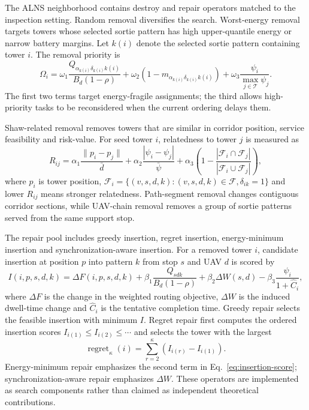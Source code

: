The ALNS neighborhood contains destroy and repair operators matched to the inspection setting. Random removal diversifies the search. Worst-energy removal targets towers whose selected sortie pattern has high upper-quantile energy or narrow battery margins. Let $k(i)$ denote the selected sortie pattern containing tower $i$. The removal priority is
\begin{equation}
\Omega_i=\omega_1\frac{Q_{\alpha_{k(i)}\delta_{k(i)}k(i)}}{B_d(1-\rho)}
+\omega_2\left(1-m_{\alpha_{k(i)}\delta_{k(i)}k(i)}\right)
+\omega_3\frac{\psi_i}{\max_{j\in\mathcal{T}}\psi_j}.
\label{eq:removal-score}
\end{equation}
The first two terms target energy-fragile assignments; the third allows high-priority tasks to be reconsidered when the current ordering delays them.

Shaw-related removal removes towers that are similar in corridor position, service feasibility and risk-value. For seed tower $i$, relatedness to tower $j$ is measured as
\begin{equation}
R_{ij}=\alpha_1\frac{\|p_i-p_j\|}{\bar d}
+\alpha_2\frac{|\psi_i-\psi_j|}{\bar\psi}
+\alpha_3\left(1-\frac{|\mathcal{F}_i\cap\mathcal{F}_j|}{|\mathcal{F}_i\cup\mathcal{F}_j|}\right),
\label{eq:shaw-relatedness}
\end{equation}
where $p_i$ is tower position, $\mathcal{F}_i=\{(v,s,d,k):(v,s,d,k)\in\mathcal{F},\delta_{ik}=1\}$ and lower $R_{ij}$ means stronger relatedness. Path-segment removal changes contiguous corridor sections, while UAV-chain removal removes a group of sortie patterns served from the same support stop.

The repair pool includes greedy insertion, regret insertion, energy-minimum insertion and synchronization-aware insertion. For a removed tower $i$, candidate insertion at position $p$ into pattern $k$ from stop $s$ and UAV $d$ is scored by
\begin{equation}
I(i,p,s,d,k)=\Delta F(i,p,s,d,k)
+\beta_1\frac{Q_{sdk}}{B_d(1-\rho)}
+\beta_2\Delta W(s,d)
-\beta_3\frac{\psi_i}{1+\widehat C_i},
\label{eq:insertion-score}
\end{equation}
where $\Delta F$ is the change in the weighted routing objective, $\Delta W$ is the induced dwell-time change and $\widehat C_i$ is the tentative completion time. Greedy repair selects the feasible insertion with minimum $I$. Regret repair first computes the ordered insertion scores $I_{i(1)}\leq I_{i(2)}\leq\cdots$ and selects the tower with the largest
\begin{equation}
\operatorname{regret}_\kappa(i)=\sum_{r=2}^{\kappa}\left(I_{i(r)}-I_{i(1)}\right).
\label{eq:regret}
\end{equation}
Energy-minimum repair emphasizes the second term in Eq.~\eqref{eq:insertion-score}; synchronization-aware repair emphasizes $\Delta W$. These operators are implemented as search components rather than claimed as independent theoretical contributions.

